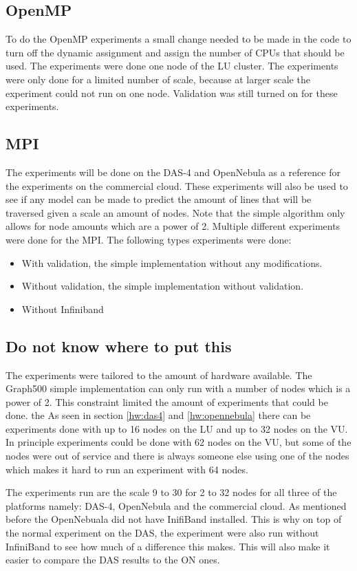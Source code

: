 \subsection{OpenMP}
To do the OpenMP experiments a small change needed to be made in the code to turn off the dynamic assignment and assign the number of CPUs that should be used. The experiments were done one node of the LU cluster. The experiments were only done for a limited number of scale, because at larger scale the experiment could not run on one node. Validation was still turned on for these experiments.

\subsection{MPI}
The experiments will be done on the DAS-4 and OpenNebula as a reference for the experiments on the commercial cloud. These experiments will also be used to see if any model can be made to predict the amount of lines that will be traversed given a scale an amount of nodes. Note that the simple algorithm only allows for node amounts which are a power of 2. Multiple different experiments were done for the MPI. The following types experiments were done:
\begin{itemize}
	\item With validation, the simple implementation without any modifications.
	\item Without validation, the simple implementation without validation.
	\item Without Infiniband
\end{itemize}

    
\subsection{Do not know where to put this}

The experiments were tailored to the amount of hardware available. The Graph500 simple implementation can only run with a number of nodes which is a power of 2. This constraint limited the amount of experiments that could be done. the As seen in section \ref{hw:das4} and \ref{hw:opennebula} there can be experiments done with up to 16 nodes on the LU and up to 32 nodes on the VU. In principle experiments could be done with 62 nodes on the VU, but some of the nodes were out of service and there is always someone else using one of the nodes which makes it hard to run an experiment with 64 nodes.

The experiments run are the scale 9 to 30 for 2 to 32 nodes for all three of the platforms namely: DAS-4, OpenNebula and the commercial cloud. As mentioned before the OpenNebuala did not have InifiBand installed. This is why on top of the normal experiment on the DAS, the experiment were also run without InfiniBand to see how much of a difference this makes. This will also make it easier to compare the DAS results to the ON ones.  
    
